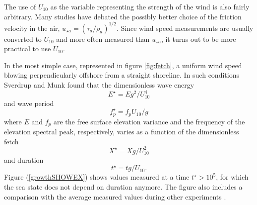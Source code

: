 The use of $U_{10}$ as the variable representing the strength of the wind is also fairly arbitrary. 
Many studies have debated the possibly better choice of the friction velocity in the air, 
 $u_{\star a}=(\tau_a / \rho_a)^{1/2}$. %
Since wind speed measurements are usually converted to $U_{10}$ and more often measured than  $u_{\star a}$, it turns out to 
be more practical to use $U_{10}$. 


In the most simple case, represented in figure \ref{fig:fetch}, 
a uniform wind speed blowing perpendicularly offshore from a straight shoreline. In such conditions 
Sverdrup and Munk found that the dimensionless wave energy  
\begin{equation}E^\star=E g^2 / U_{10}^4
\end{equation} and wave period
\begin{equation}
f_p^\star=f_p U_{10} / g
\end{equation}
 where $E$ and $f_p$ are the free surface elevation variance 
and the frequency of the elevation spectral peak, respectively, varies as a function of the dimensionless fetch
\begin{equation} X^\star=X g /
U_{10}^2 \end{equation} and duration
\begin{equation}
t^\star=t g/U_{10}.
\end{equation}
Figure
(\ref{growthSHOWEX}) shows values measured at a time  $t^\star >
10^5$, for which the sea state does not depend on duration anymore. The figure also includes a comparison with 
the average measured values during other experiments \cite{Kahma&Calkoen1992,Kahma1981}.
